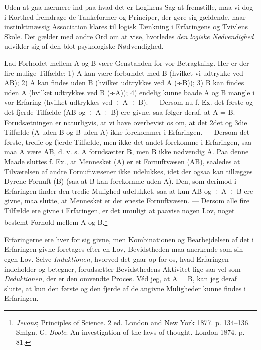 \documentclass[12pt,a4paper,openany]{book}
\newcommand{\opage}[1]{\marginnote{\footnotesize\textit{[#1]}}}
\begin{document}
\opage{214}Uden at gaa nærmere ind paa hvad det er Logikens Sag at
fremstille, maa vi dog i Korthed fremdrage de Tankeformer og Principer,
der gøre sig gældende, naar instinktmæssig Association klares til logisk
Tænkning i Erfaringens og Tvivlens Skole. Det gælder med andre Ord om at
vise, hvorledes \emph{den logiske Nødvendighed} udvikler sig af den blot
psykologiske Nødvendighed.

Lad Forholdet mellem A og B være Genstanden for vor Betragtning. Her er
der fire mulige Tilfælde: 1) A kan være forbundet med B (hvilket vi
udtrykke ved AB); 2) A kan findes uden B (hvilket udtrykkes ved A (÷B));
3) B kan findes uden A (hvilket udtrykkes ved B (÷A)); 4) endelig kunne
baade A og B mangle i vor Erfaring (hvilket udtrykkes ved ÷ A ÷ B). ---
Dersom nu f. Ex. det første og det fjerde Tilfælde (AB og ÷ A ÷ B) ere
givne, saa følger deraf, at A = B. Forudsætningen er naturligvis, at vi
have overbevist os om, at det 2det og 3die Tilfælde (A uden B og B uden
A) ikke forekommer i Erfaringen. --- Dersom det første, tredie og fjerde
Tilfælde, men ikke det andet forekomme i Erfaringen, saa maa A være AB,
d. v. s. A forudsætter B, men B ikke nødvendig A. Paa denne Maade
sluttes f. Ex., at Mennesket (A) er et Fornuftvæsen (AB), saaledes at
Tilværelsen af andre Fornuftvæsener ikke udelukkes, idet der ogsaa kan
tillægges Dyrene Fornuft (B) (saa at B kan forekomme uden A). Den, som
derimod i Erfaringen finder den tredie Mulighed udelukket, saa at kun AB
og ÷ A ÷ B ere givne, maa slutte, at Mennesket er det eneste
Fornuftvæsen. --- Dersom alle fire Tilfælde ere givne i Erfaringen, er
det umuligt at paavise nogen Lov, noget bestemt Forhold mellem A og
B.\footnote[1]{\emph{Jevons}; Principles of Science. 2 ed. London and
New York 1877. p. 134--136. Smlgn. G. \emph{Boole}: An investigation of
the laws of thought. London 1874. p. 81.}

Erfaringerne ere hver for sig givne, men Kombinationen og Bearbejdelsen
af det i Erfaringen givne foretages efter en Lov, Bevidstheden maa
anerkende som sin egen Lov. Selve \emph{Induktionen}, hvorved det gaar
op for os, hvad Erfaringen indeholder og betegner, forudsætter
Bevidsthedens Aktivitet lige saa vel som \emph{Deduktionen}, der er den
omvendte Proces.
\opage{215}Véd jeg, at A = B, kan jeg deraf slutte, at kun den første og
den fjerde af de angivne Muligheder kunne findes i Erfaringen.
\end{document}
